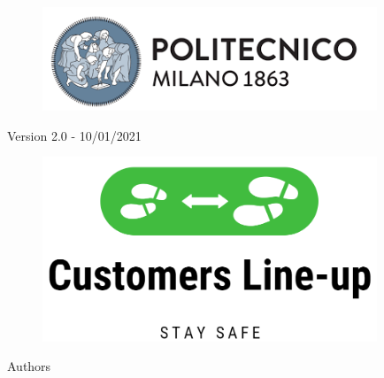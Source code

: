 \thispagestyle{empty}
\begin{center}

    \begin{figure}[!h] 
    \centering
    \includegraphics[width=100mm]{./Images/Polimilogo} 
     \end{figure}
    { \small {\mycourse} \par}
\vspace{0.3\baselineskip}
    {\bf \large{\mydep} \par}
\vspace{\baselineskip}
    { \Large {\bfseries {\mytitle}} \par}
\vspace{0.5\baselineskip}
	{ \small {Version 2.0 - 10/01/2021} \par}
\vspace{\baselineskip}
	\begin{figure}[!h] 
    \centering
    \includegraphics[width=100mm]{./Images/MockupLogo/LogoEnorme} 
     \end{figure}
\vspace{0.7\baselineskip}
\vspace{\baselineskip} 
    {Authors \par}
\vspace{0.4\baselineskip}
    {{\large {\bf \myname \\ \myrollno}} \par}

\end{center}

